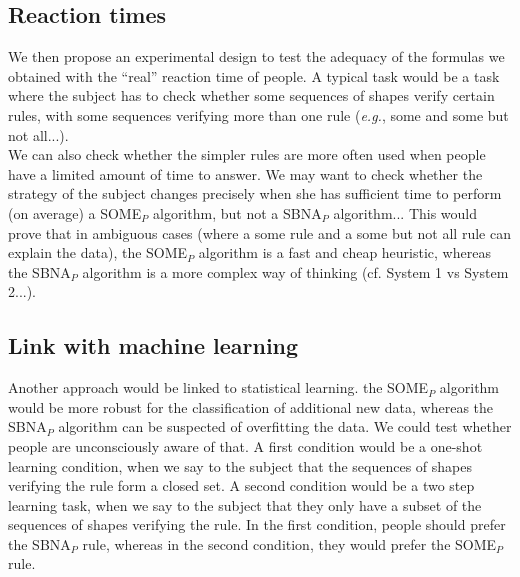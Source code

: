\documentclass[]{article}
\begin{document}
\subsection{Reaction times}
We then propose an experimental design to test the adequacy of the formulas we obtained with the ``real'' reaction time of people. A typical task would be a task where the subject has to check whether some sequences of shapes verify certain rules, with some sequences verifying more than one rule (\textit{e.g.}, some and some but not all...).\\
We can also check whether the simpler rules are more often used when people have a limited amount of time to answer. We may want to check whether the strategy of the subject changes precisely when she has sufficient time to perform (on average) a SOME$_P$ algorithm, but not a SBNA$_P$ algorithm... This would prove that in ambiguous cases (where a some rule and a some but not all rule can explain the data), the SOME$_P$ algorithm is a fast and cheap heuristic, whereas the SBNA$_P$ algorithm is a more complex way of thinking (cf. System 1 vs System 2...).
\subsection{Link with machine learning}
Another approach would be linked to statistical learning. the SOME$_P$ algorithm would be more robust for the classification of additional new data, whereas the SBNA$_P$ algorithm can be suspected of overfitting the data. We could test whether people are unconsciously aware of that. A first condition would be a one-shot learning condition, when we say to the subject that the sequences of shapes verifying the rule form a closed set. A second condition would be a two step learning task, when we say to the subject that they only have a subset of the sequences of shapes verifying the rule. In the first condition, people should prefer the SBNA$_P$ rule, whereas in the second condition, they would prefer the SOME$_P$ rule.
\end{document}
